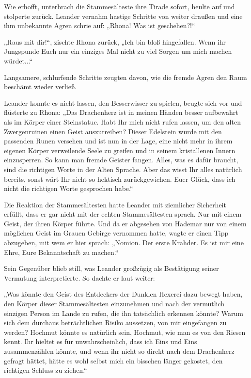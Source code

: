 \documentclass[10pt, a4paper, oneside]{book}
\begin{document}
Wie erhofft, unterbrach die Stammesälteste ihre Tirade sofort, heulte auf und stolperte zurück. Leander vernahm hastige Schritte von weiter draußen und eine ihm unbekannte Agren schrie auf: „Rhona! Was ist geschehen?!“

„Raus mit dir!“, zischte Rhona zurück, „Ich bin bloß hingefallen. Wenn ihr Jungspunde Euch nur ein einziges Mal nicht zu viel Sorgen um mich machen würdet...“

Langsamere, schlurfende Schritte zeugten davon, wie die fremde Agren den Raum beschämt wieder verließ.

Leander konnte es nicht lassen, den Besserwisser zu spielen, beugte sich vor und flüsterte zu Rhona: „Das Drachenherz ist in meinen Händen besser aufbewahrt als im Körper einer Steinstatue. Habt Ihr mich nicht rufen lassen, um den alten Zwergenruinen einen Geist auszutreiben? Dieser Edelstein wurde mit den passenden Runen versehen und ist nun in der Lage, eine nicht mehr in ihrem eigenen Körper verweilende Seele zu greifen und in seinem kristallenen Innern einzusperren. So kann man fremde Geister fangen. Alles, was es dafür braucht, sind die richtigen Worte in der Alten Sprache. Aber das wisst Ihr alles natürlich bereits, sonst wärt Ihr nicht so hektisch zurückgewichen. Euer Glück, dass ich nicht die richtigen Worte gesprochen habe.“

Die Reaktion der Stammesältesten hatte Leander mit ziemlicher Sicherheit erfüllt, dass er gar nicht mit der echten Stammesältesten sprach. Nur mit einem Geist, der ihren Körper führte. Und da er abgesehen von Hademar nur von einem möglichen Geist im Grauen Gebirge vernommen hatte, wagte er einen Tipp abzugeben, mit wem er hier sprach: „Nomion. Der erste Krahder. Es ist mir eine Ehre, Eure Bekanntschaft zu machen.“

Sein Gegenüber blieb still, was Leander großzügig als Bestätigung seiner Vermutung interpretierte. So dachte er laut weiter:

„Was könnte den Geist des Entdeckers der Dunklen Hexerei dazu bewegt haben, den Körper dieser Stammesältesten einzunehmen und nach der vermutlich einzigen Person im Lande zu rufen, die ihn tatsächlich erkennen könnte? Warum sich dem durchaus beträchtlichen Risiko aussetzen, von mir eingefangen zu werden? Hochmut könnte es natürlich sein, Hochmut, wie man es von den Riesen kennt. Ihr hieltet es für unwahrscheinlich, dass ich Eins und Eins zusammenzählen könnte, und wenn ihr nicht so direkt nach dem Drachenherz gefragt hättet, hätte es wohl selbst mich ein bisschen länger gekostet, den richtigen Schluss zu ziehen.“
\end{document}
